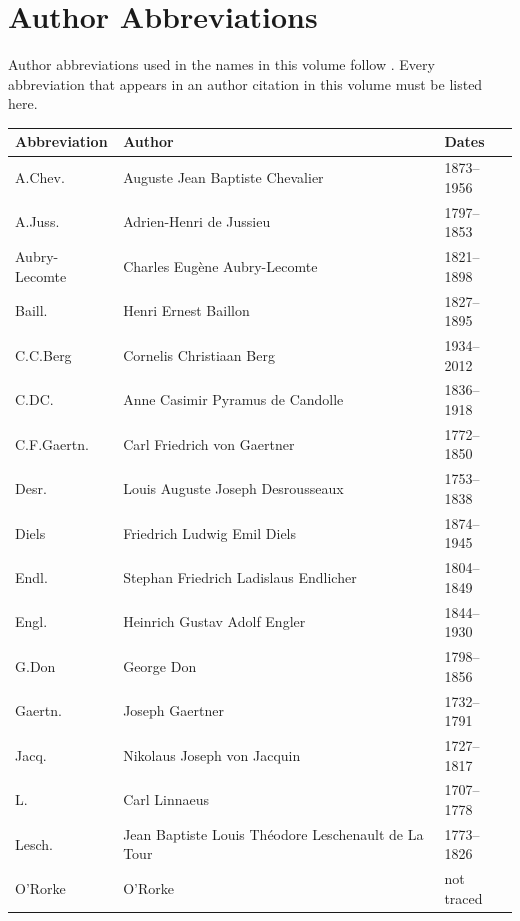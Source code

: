 \chapter{Author Abbreviations}
\label{app:authors}

Author abbreviations used in the names in this volume follow
\citet{brummitt1992}. Every abbreviation that appears in an author
citation in this volume must be listed here.

\begin{longtable}{@{}p{}p{}p{}@{}}
	\toprule
	Abbreviation & Author & Dates \\
	\midrule
	\endhead
	\bottomrule
	\endfoot
	A.Chev.       & Auguste Jean Baptiste Chevalier            & 1873--1956 \\
	A.Juss.       & Adrien-Henri de Jussieu                    & 1797--1853 \\
	Aubry-Lecomte & Charles Eug{\`e}ne Aubry-Lecomte           & 1821--1898 \\
	Baill.        & Henri Ernest Baillon                       & 1827--1895 \\
	C.C.Berg      & Cornelis Christiaan Berg                   & 1934--2012 \\
	C.DC.         & Anne Casimir Pyramus de Candolle           & 1836--1918 \\
	C.F.Gaertn.   & Carl Friedrich von Gaertner                & 1772--1850 \\
	Desr.         & Louis Auguste Joseph Desrousseaux          & 1753--1838 \\
	Diels         & Friedrich Ludwig Emil Diels                & 1874--1945 \\
	Endl.         & Stephan Friedrich Ladislaus Endlicher      & 1804--1849 \\
	Engl.         & Heinrich Gustav Adolf Engler               & 1844--1930 \\
	G.Don         & George Don                                 & 1798--1856 \\
	Gaertn.       & Joseph Gaertner                            & 1732--1791 \\
	Jacq.         & Nikolaus Joseph von Jacquin                & 1727--1817 \\
	L.            & Carl Linnaeus                              & 1707--1778 \\
	Lesch.        & Jean Baptiste Louis Th{\'e}odore Leschenault de La Tour & 1773--1826 \\
	O'Rorke       & O'Rorke                                    & not traced \\

\end{longtable}
